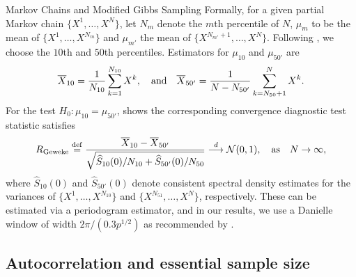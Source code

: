 \begin{chapter}{Markov Chains and Modified Gibbs Sampling}
Formally, for a given partial Markov chain $\{X^1,\dots, X^N\}$, let $N_m$ denote the $m$th percentile of $N$, $\mu_m$ to be the mean of $\{X^1,\dots, X^{N_m}\}$ and $\mu_{m'}$ the mean of $\{X^{N_{m'}+1},\dots, X^N\}$.
Following \citep{geweke1991evaluating}, we choose the $10$th and $50$th percentiles.
Estimators for $\mu_{10}$ and $\mu_{50'}$ are
\begin{equation}
  \bar X_{10}=\frac{1}{N_{10}}\sum_{k=1}^{N_{10}}X^k,\quad{\rm and}\quad\bar X_{50'}=\frac{1}{N-N_{50'}}\sum_{k=N_{50}+1}^N X^k.
\end{equation}
For the test $H_0:\mu_{10} = \mu_{50'}$, \citep{geweke1991evaluating} shows the corresponding convergence diagnostic test statistic satisfies
\begin{equation}
\label{Geweke}
R_{\rm Geweke}\eqdef\frac{\bar X_{10}-\bar X_{50'}}{\sqrt{\hat S_{10}(0)/N_{10}+\hat S_{50'}(0)/N_{50}}}\stackrel{d}{\longrightarrow}\N(0,1),\quad{\rm as}\quad N\rightarrow\infty,
\end{equation}
where $\hat S_{10}(0)$ and $\hat S_{50'}(0)$ denote consistent spectral density estimates for the variances of $\{X^1,\dots, X^{N_{10}}\}$ and $\{X^{N_{51}},\dots, X^N\}$, respectively. 
These can be estimated via a periodogram estimator, and in our results, we use a Danielle window of width $2\pi/(0.3p^{1/2})$ as recommended by \citep{geweke1991evaluating}.

\subsection{Autocorrelation and essential sample size}


\end{chapter}
